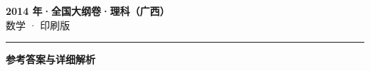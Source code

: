\documentclass[zihao=5, a4paper]{ctexart}
\begin{document}
\begin{center}
  {\Large\bfseries 2014 年·全国大纲卷·理科（广西）}\\[4pt]
  {\large 数学 · 印刷版}
\end{center}
\medskip
{}

\par\bigskip\hrule\bigskip
{}
\Needspace{0.55\textheight}
\begin{center}{\large\bfseries 参考答案与详细解析}\end{center}
\smallskip

\end{document}
